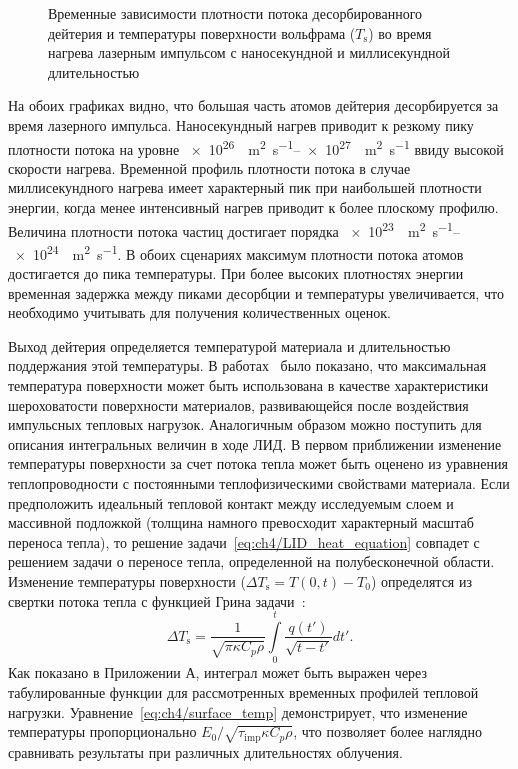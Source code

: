 \begin{figure}[ht]
    \caption{Временные зависимости плотности потока десорбированного дейтерия и температуры поверхности вольфрама ($T_\mathrm{s}$) во время нагрева лазерным импульсом с наносекундной и миллисекундной длительностью}\label{fig:ch4/LID_flux}
\end{figure}

На обоих графиках видно, что большая часть атомов дейтерия десорбируется за время лазерного импульса. Наносекундный нагрев приводит к резкому пику плотности потока на уровне \SIrange{e26}{e27}{\per\meter\squared\per\second} ввиду высокой скорости нагрева. Временной профиль плотности потока в случае миллисекундного нагрева имеет характерный пик при наибольшей плотности энергии, когда менее интенсивный нагрев приводит к более плоскому профилю. Величина плотности потока частиц достигает порядка \SIrange{e23}{e24}{\per\meter\squared\per\second}. В обоих сценариях максимум плотности потока атомов достигается до пика температуры. При более высоких плотностях энергии временная задержка между пиками десорбции и температуры увеличивается, что необходимо учитывать для получения количественных оценок.

Выход дейтерия определяется температурой материала и длительностью поддержания этой температуры. В работах~\cite{VanEden2014,Yu2015} было показано, что максимальная температура поверхности может быть использована в качестве характеристики шероховатости поверхности материалов, развивающейся после воздействия импульсных тепловых нагрузок. Аналогичным образом можно поступить для описания интегральных величин в ходе ЛИД. В первом приближении изменение температуры поверхности за счет потока тепла может быть оценено из уравнения теплопроводности с постоянными теплофизическими свойствами материала. Если предположить идеальный тепловой контакт между исследуемым слоем и массивной подложкой (толщина намного превосходит характерный масштаб переноса тепла), то решение задачи~\cref{eq:ch4/LID_heat_equation} совпадет с решением задачи о переносе тепла, определенной на полубесконечной области. Изменение температуры поверхности (\( \Delta T_\mathrm{s} = T(0,t)-T_0\)) определятся из свертки потока тепла с функцией Грина задачи~\cite{Bechtel1975}:
\begin{equation}
    \label{eq:ch4/surface_temp}
    \Delta T_\mathrm{s} = \frac{1}{\sqrt{\pi \kappa C_p \rho}} \int\limits_0^t \frac{q(t')}{\sqrt{t-t'}}dt'.
\end{equation}
Как показано в Приложении А, интеграл может быть выражен через табулированные функции для рассмотренных временных профилей тепловой нагрузки. Уравнение~\cref{eq:ch4/surface_temp} демонстрирует, что изменение температуры пропорционально \( E_0 /\sqrt{\tau_\mathrm{imp}\kappa C_p \rho} \), что позволяет более наглядно сравнивать результаты при различных длительностях облучения.

